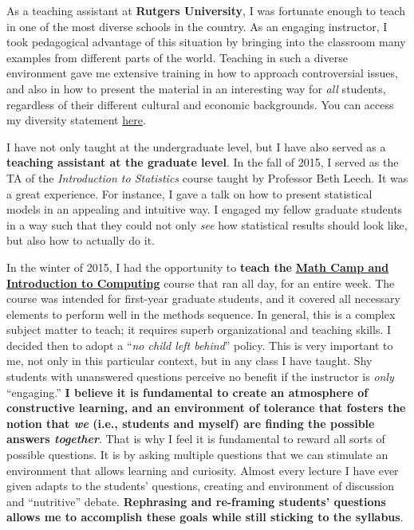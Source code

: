 As a teaching assistant at {\bf Rutgers University}, I was fortunate enough to teach in one of the most diverse schools in the country. As an engaging instructor, I took pedagogical advantage of this situation by bringing into the classroom many examples from different parts of the world. Teaching in such a diverse environment gave me extensive training in how to approach controversial issues, and also in how to present the material in an interesting way for \emph{all} students, regardless of their different cultural and economic backgrounds. You can access my diversity statement \href{http://github.com/hbahamonde/Job_Market/raw/master/Bahamonde_Diversity_Statement.pdf}{here}.


I have not only taught at the undergraduate level, but I have also served as a {\bf teaching assistant at the graduate level}. In the fall of 2015, I served as the TA of the \emph{Introduction to Statistics} course taught by Professor Beth Leech. It was a great experience. For instance, I gave a talk on how to present statistical models in an appealing and intuitive way. I engaged my fellow graduate students in a way such that they could not only \emph{see} how statistical results should look like, but also how to actually do it. 

In the winter of 2015, I had the opportunity to {\bf teach the} \href{https://github.com/hbahamonde/Math-Camp/raw/master/Syllabus/Math_Camp_Syllabus.pdf}{{\bf Math Camp and Introduction to Computing}} course that ran all day, for an entire week. The course was intended for first-year graduate students, and it covered all necessary elements to perform well in the methods sequence. In general, this is a complex subject matter to teach; it requires superb organizational and teaching skills. I decided then to adopt a ``\emph{no child left behind}'' policy. This is very important to me, not only in this particular context, but in any class I have taught. Shy students with unanswered questions perceive no benefit if the instructor is \emph{only} ``engaging.'' {\bf I believe it is fundamental to create an atmosphere of constructive learning, and an environment of tolerance that fosters the notion that \emph{we} (i.e., students and myself) are finding the possible answers \emph{together}}. That is why I feel it is fundamental to reward all sorts of possible questions. It is by asking multiple questions that we can stimulate an environment that allows learning and curiosity. Almost every lecture I have ever given adapts to the students' questions, creating and environment of discussion and ``nutritive'' debate. {\bf Rephrasing and re-framing students' questions allows me to accomplish these goals while still sticking to the syllabus}. 

